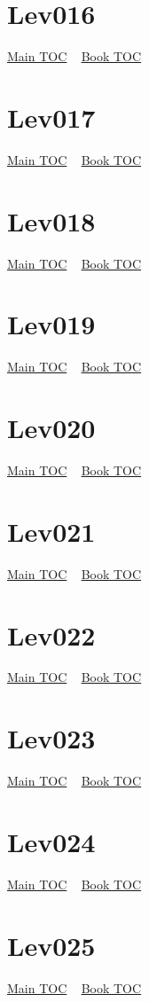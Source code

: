 \documentclass{book}
\begin{document}
  \section{Lev016}\hyperlink{toc}{Main TOC} ~ \hyperref[subsec:Lev]{Book TOC} 
  \section{Lev017}\hyperlink{toc}{Main TOC} ~ \hyperref[subsec:Lev]{Book TOC} 
  \section{Lev018}\hyperlink{toc}{Main TOC} ~ \hyperref[subsec:Lev]{Book TOC} 
  \section{Lev019}\hyperlink{toc}{Main TOC} ~ \hyperref[subsec:Lev]{Book TOC} 
  \section{Lev020}\hyperlink{toc}{Main TOC} ~ \hyperref[subsec:Lev]{Book TOC} 
  \section{Lev021}\hyperlink{toc}{Main TOC} ~ \hyperref[subsec:Lev]{Book TOC} 
  \section{Lev022}\hyperlink{toc}{Main TOC} ~ \hyperref[subsec:Lev]{Book TOC} 
  \section{Lev023}\hyperlink{toc}{Main TOC} ~ \hyperref[subsec:Lev]{Book TOC} 
  \section{Lev024}\hyperlink{toc}{Main TOC} ~ \hyperref[subsec:Lev]{Book TOC} 
  \section{Lev025}\hyperlink{toc}{Main TOC} ~ \hyperref[subsec:Lev]{Book TOC} 
\end{document}
